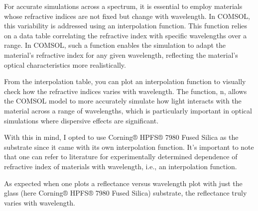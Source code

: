 

For accurate simulations across a spectrum, it is essential to employ materials whose refractive indices are not fixed but change with wavelength. In COMSOL, this variability is addressed using an interpolation function. This function relies on a data table correlating the refractive index with specific wavelengths over a range. In COMSOL, such a function enables the simulation to adapt the material's refractive index for any given wavelength, reflecting the material's optical characteristics more realistically.



From the interpolation table, you can plot an interpolation function to visually check how the refractive indices varies with wavelength. The function, n, allows the COMSOL model to more accurately simulate how light interacts with the material across a range of wavelengths, which is particularly important in optical simulations where dispersive effects are significant.

With this in mind, I opted to use Corning® HPFS® 7980 Fused Silica as the substrate since it came with its own interpolation function. It's important to note that one can refer to literature for experimentally determined dependence of refractive index of materials with wavelength, i.e., an interpolation function.

As expected when one plots a reflectance versus wavelength plot with just the glass (here Corning® HPFS® 7980 Fused Silica) substrate, the reflectance truly varies with wavelength.

